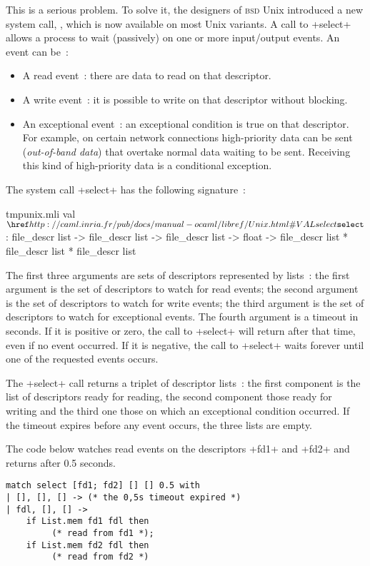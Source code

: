 This is a serious problem. To solve it, the designers of \textsc{bsd}
Unix introduced a new system call, , which is now
available on most Unix variants. A call to \ml+select+ allows a
process to wait (passively) on one or more input/output events.
An event can be~:
%
\begin{itemize}
\item A read event~: there are data to read on that descriptor.

\item A write event~: it is possible to write on that descriptor
  without blocking.

\item An exceptional event~: an exceptional condition is
  true on that descriptor. For example, on certain network connections
  high-priority data can be sent (\emph{out-of-band data}) that
  overtake normal data waiting to be sent. Receiving this kind of 
  high-priority data is a conditional exception.
\end{itemize}
%
The system call \ml+select+ has the following signature~:
%
\begin{listingcodefile}{tmpunix.mli}
val $\libvalue{Unix}{select}$ : 
    file_descr list -> file_descr list -> file_descr list -> 
      float -> file_descr list * file_descr list * file_descr list
\end{listingcodefile}
%
The first three arguments are sets of descriptors represented by
lists~: the first argument is the set of descriptors to watch for read
events; the second argument is the set of descriptors to watch for
write events; the third argument is the set of descriptors to watch
for exceptional events. The fourth argument is a timeout in
seconds. If it is positive or zero, the call to \ml+select+ will return
after that time, even if no event occurred. If it is negative, the call
to \ml+select+ waits forever until one of the requested events occurs.

The \ml+select+ call returns a triplet of descriptor lists~: the first
component is the list of descriptors ready for reading, the second
component those ready for writing and the third one those on which an
exceptional condition occurred. If the timeout expires before any
event occurs, the three lists are empty.

\begin{example} 
The code below watches read events on the descriptors \ml+fd1+ and 
\ml+fd2+ and returns after 0.5 seconds. 
\begin{lstlisting}
match select [fd1; fd2] [] [] 0.5 with
| [], [], [] -> (* the 0,5s timeout expired *)
| fdl, [], [] ->
    if List.mem fd1 fdl then
         (* read from fd1 *);
    if List.mem fd2 fdl then
         (* read from fd2 *)
\end{lstlisting}
\end{example}

